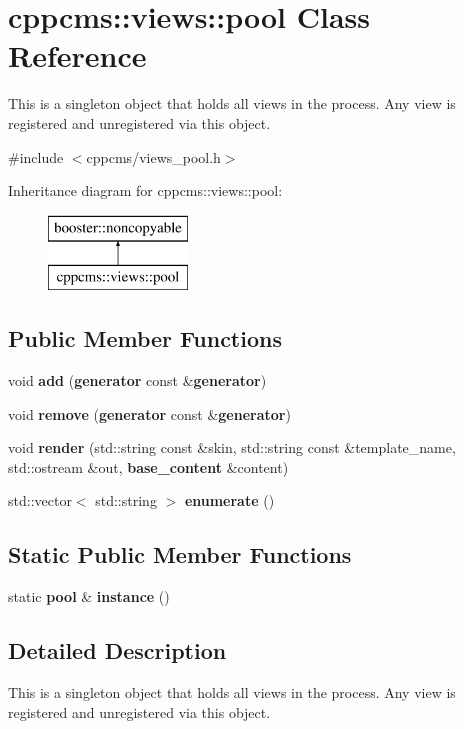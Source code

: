 \section{cppcms\-:\-:views\-:\-:pool Class Reference}
\label{classcppcms_1_1views_1_1pool}


This is a singleton object that holds all views in the process. Any view is registered and unregistered via this object.  




{\ttfamily \#include $<$cppcms/views\-\_\-pool.\-h$>$}

Inheritance diagram for cppcms\-:\-:views\-:\-:pool\-:\begin{figure}[H]
\begin{center}
\leavevmode
\includegraphics[height=2.000000cm]{classcppcms_1_1views_1_1pool}
\end{center}
\end{figure}
\subsection*{Public Member Functions}
\begin{DoxyCompactItemize}
\item 
void {\bf add} ({\bf generator} const \&{\bf generator})
\item 
void {\bf remove} ({\bf generator} const \&{\bf generator})
\item 
void {\bf render} (std\-::string const \&skin, std\-::string const \&template\-\_\-name, std\-::ostream \&out, {\bf base\-\_\-content} \&content)
\item 
std\-::vector$<$ std\-::string $>$ {\bf enumerate} ()
\end{DoxyCompactItemize}
\subsection*{Static Public Member Functions}
\begin{DoxyCompactItemize}
\item 
static {\bf pool} \& {\bf instance} ()
\end{DoxyCompactItemize}


\subsection{Detailed Description}
This is a singleton object that holds all views in the process. Any view is registered and unregistered via this object. 

